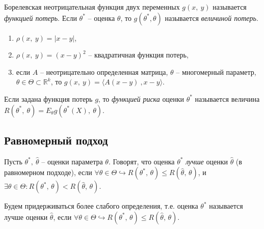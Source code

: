 \begin{definition}
    Борелевская неотрицательная функция двух переменных $\displaystyle g(x,\ y)$ называется \textit{функцией потерь}. Если $\displaystyle \theta ^{*}$ -- оценка $\displaystyle \theta $, то $\displaystyle g\left( \theta ^{*} ,\theta \right)$ называется \textit{величиной потерь}.
\end{definition}

\begin{example}
    \begin{enumerate}\
        \item $\displaystyle \rho (x,\ y) =| x-y| $,
        \item $\displaystyle \rho (x,\ y) =( x-y)^{2}$ -- квадратичная функция потерь,
        \item если $\displaystyle A$ -- неотрицательно определенная матрица, $\displaystyle \theta $ -- многомерный параметр, $\displaystyle \theta \in \Theta \subset \mathbb{R}^{k}$, то $\displaystyle g(x,\ y) =\langle A( x-y)\ ,x-y\rangle $.
    \end{enumerate}
\end{example}

\begin{definition}
    Если задана функция потерь $\displaystyle g$, то \textit{функцией риска} оценки $\displaystyle \theta ^{*}$ называется величина $\displaystyle R\left( \theta ^{*},\ \theta \right) =E_{\theta } g\left( \theta ^{*}( X),\ \theta \right)$.
\end{definition}

\subsection*{Равномерный подход}

\begin{definition}
    Пусть $\displaystyle \theta ^{*},\ \hat{\theta }$ -- оценки параметра $\displaystyle \theta $. Говорят, что оценка $\displaystyle \theta ^{*}$ \textit{лучше} оценки $\displaystyle \hat{\theta }$ (в равномерном подходе), если $\displaystyle \forall \theta \in \Theta \hookrightarrow R\left( \theta ^{*},\, \theta \right) \leqslant R(\hat{\theta },\, \theta )$, и $\displaystyle \exists \theta \in \Theta :R\left( \theta ^{*},\, \theta \right) < R(\hat{\theta },\, \theta )$.
\end{definition}

\begin{note}
    Будем придерживаться более слабого определения, т.е. оценка $\displaystyle \theta ^{*}$ называется лучше оценки $\displaystyle \hat{\theta }$, если $\displaystyle \forall \theta \in \Theta \hookrightarrow R\left( \theta ^{*},\, \theta \right) \leqslant R(\hat{\theta },\, \theta )$.
\end{note}

